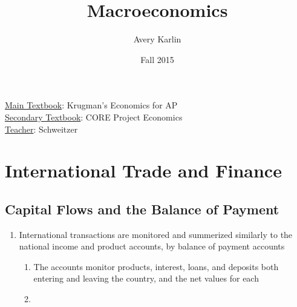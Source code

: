 \documentclass[11 pt, twoside]{article}
\begin{document}
\title{Macroeconomics}
\author{Avery Karlin}
\date{Fall 2015}

\maketitle
\newpage
\tableofcontents
\vspace{11pt}
\noindent
\underline{Main Textbook}: Krugman's Economics for AP\\
\underline{Secondary Textbook}: CORE Project Economics\\
\underline{Teacher}: Schweitzer
\newpage





\section{International Trade and Finance}

\subsection{Capital Flows and the Balance of Payment}
\begin{enumerate}
\item International transactions are monitored and summerized similarly to the national income and product accounts, by balance of payment accounts
\begin{enumerate}
\item The accounts monitor products, interest, loans, and deposits both entering and leaving the country, and the net values for each
\item 
\end{enumerate}
\end{enumerate}
\end{document}
